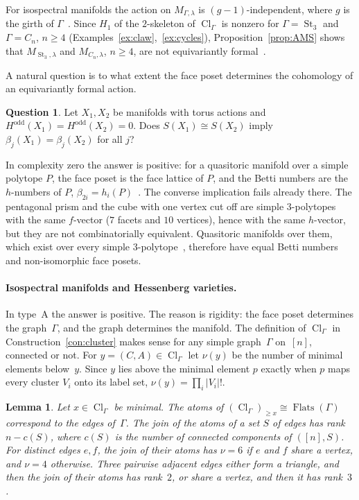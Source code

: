 \documentclass[11pt,a4paper]{article}
\numberwithin{equation}{section}
\theoremstyle{plain}
\newtheorem{lemma}[theorem]{Lemma}
\theoremstyle{definition}
\newtheorem{question}{Question}
\theoremstyle{remark}
\DeclareMathOperator{\Flats}{Flats}
\DeclareMathOperator{\Cl}{Cl}
\DeclareMathOperator{\St}{St}
\begin{document}
For isospectral manifolds the action on $M_{\Gamma,\lambda}$ is $(g-1)$-independent, where $g$ is the girth of $\Gamma$~\cite[Thm.~1(5)]{AB24}. Since $H_1$ of the $2$-skeleton of $\Cl_\Gamma$ is nonzero for $\Gamma=\St_3$ and $\Gamma=C_n$, $n\geqslant4$ (Examples~\ref{ex:claw},~\ref{ex:cycles}), Proposition~\ref{prop:AMS} shows that $M_{\St_3,\lambda}$ and $M_{C_n,\lambda}$, $n\geqslant4$, are not equivariantly formal~\cite{AB24}.

A natural question is to what extent the face poset determines the cohomology of an equivariantly formal action.

\begin{question}\label{q:betti}
Let $X_1,X_2$ be manifolds with torus actions and $H^{\mathrm{odd}}(X_1)=H^{\mathrm{odd}}(X_2)=0$. Does $S(X_1)\cong S(X_2)$ imply $\beta_j(X_1)=\beta_j(X_2)$ for all $j$?
\end{question}

In complexity zero the answer is positive: for a quasitoric manifold over a simple polytope $P$, the face poset is the face lattice of $P$, and the Betti numbers are the $h$-numbers of $P$, $\beta_{2i}=h_i(P)$~\cite{BP15}. The converse implication fails already there. The pentagonal prism and the cube with one vertex cut off are simple $3$-polytopes with the same $f$-vector ($7$ facets and $10$ vertices), hence with the same $h$-vector, but they are not combinatorially equivalent. Quasitoric manifolds over them, which exist over every simple $3$-polytope~\cite{BP15}, therefore have equal Betti numbers and non-isomorphic face posets.

\paragraph{Isospectral manifolds and Hessenberg varieties.}
In type~A the answer is positive. The reason is rigidity: the face poset determines the graph~$\Gamma$, and the graph determines the manifold. The definition of $\Cl_\Gamma$ in Construction~\ref{con:cluster} makes sense for any simple graph~$\Gamma$ on~$[n]$, connected or not. For $y=(C,A)\in\Cl_\Gamma$ let $\nu(y)$ be the number of minimal elements below~$y$. Since $y$ lies above the minimal element $p$ exactly when $p$ maps every cluster $V_i$ onto its label set, $\nu(y)=\prod_i|V_i|!$.

\begin{lemma}\label{lem:atoms-nu}
Let $x\in\Cl_\Gamma$ be minimal. The atoms of $(\Cl_\Gamma)_{\geqslant x}\cong\Flats(\Gamma)$ correspond to the edges of~$\Gamma$. The join of the atoms of a set $S$ of edges has rank $n-c(S)$, where $c(S)$ is the number of connected components of $([n],S)$. For distinct edges $e,f$, the join of their atoms has $\nu=6$ if $e$ and $f$ share a vertex, and $\nu=4$ otherwise. Three pairwise adjacent edges either form a triangle, and then the join of their atoms has rank~$2$, or share a vertex, and then it has rank~$3$.
\end{lemma}
\end{document}
